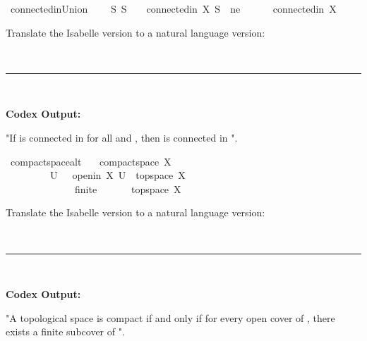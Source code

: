 \documentclass{article}
\begin{document}
\begin{boxB}
\begin{isabelle}
\isamarkupfalse \ connectedin{\isacharunderscore}{\kern0pt}Union{\isacharcolon}{\kern0pt}\isanewline
\ \ \ {\isasymU}{\isacharcolon}{\kern0pt}\ {\isachardoublequoteopen}{\isasymAnd}S{\isachardot}{\kern0pt}\ S\ {\isasymin}\ {\isasymU}\ {\isasymLongrightarrow}\ connectedin\ X\ S{\isachardoublequoteclose}\ \ ne{\isacharcolon}{\kern0pt}\ {\isachardoublequoteopen}{\isasymInter}{\isasymU}\ {\isasymnoteq}\ {\isacharbraceleft}{\kern0pt}{\isacharbraceright}{\kern0pt}{\isachardoublequoteclose}\isanewline
\ \ \ {\isachardoublequoteopen}connectedin\ X\ {\isacharparenleft}{\kern0pt}{\isasymUnion}{\isasymU}{\isacharparenright}{\kern0pt}{\isachardoublequoteclose}
\end{isabelle}
Translate the Isabelle version to a natural language version:

\
\hrule
\

\textbf{Codex Output:}

"If  is connected in  for all  and , then  is connected in ".
\end{boxB}

\begin{boxB}
\begin{isabelle}
\isamarkupfalse \ compact{\isacharunderscore}{\kern0pt}space{\isacharunderscore}{\kern0pt}alt{\isacharcolon}{\kern0pt}\isanewline
\ \ \ {\isachardoublequoteopen}compact{\isacharunderscore}{\kern0pt}space\ X\ {\isasymlongleftrightarrow}\isanewline
\ \ \ \ \ \ \ \ {\isacharparenleft}{\kern0pt}{\isasymforall}{\isasymU}{\isachardot}{\kern0pt}\ {\isacharparenleft}{\kern0pt}{\isasymforall}U\ {\isasymin}\ {\isasymU}{\isachardot}{\kern0pt}\ openin\ X\ U{\isacharparenright}{\kern0pt}\ {\isasymand}\ topspace\ X\ {\isasymsubseteq}\ {\isasymUnion}{\isasymU}\isanewline
\ \ \ \ \ \ \ \ \ \ \ \ {\isasymlongrightarrow}\ {\isacharparenleft}{\kern0pt}{\isasymexists}{\isasymF}{\isachardot}{\kern0pt}\ finite\ {\isasymF}\ {\isasymand}\ {\isasymF}\ {\isasymsubseteq}\ {\isasymU}\ {\isasymand}\ topspace\ X\ {\isasymsubseteq}\ {\isasymUnion}{\isasymF}{\isacharparenright}{\kern0pt}{\isacharparenright}{\kern0pt}{\isachardoublequoteclose}
\end{isabelle}
Translate the Isabelle version to a natural language version:

\
\hrule
\

\textbf{Codex Output:}

"A topological space  is compact if and only if for every open cover  of , there exists a finite subcover  of ".
\end{boxB}
\end{document}
